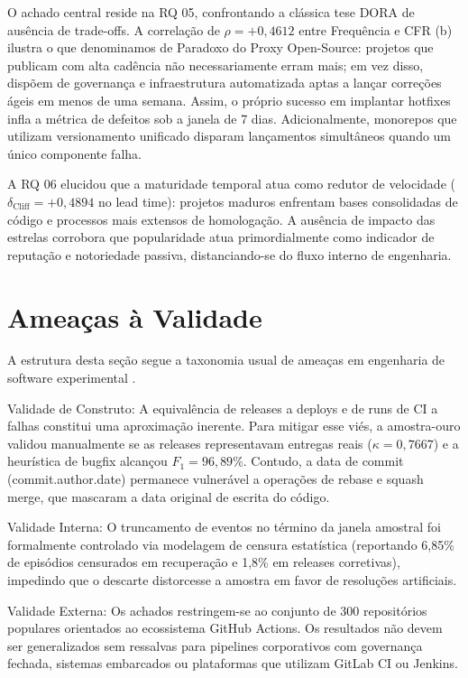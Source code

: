 \documentclass[12pt]{article}
\begin{document}
O achado central reside na RQ 05, confrontando a clássica tese DORA de ausência de trade-offs. A correlação de $\rho = +0{,}4612$ entre Frequência e CFR (b) ilustra o que denominamos de Paradoxo do Proxy Open-Source: projetos que publicam com alta cadência não necessariamente erram mais; em vez disso, dispõem de governança e infraestrutura automatizada aptas a lançar correções ágeis em menos de uma semana. Assim, o próprio sucesso em implantar hotfixes infla a métrica de defeitos sob a janela de 7 dias. Adicionalmente, monorepos que utilizam versionamento unificado disparam lançamentos simultâneos quando um único componente falha.

A RQ 06 elucidou que a maturidade temporal atua como redutor de velocidade ($\delta_{\text{Cliff}} = +0{,}4894$ no lead time): projetos maduros enfrentam bases consolidadas de código e processos mais extensos de homologação. A ausência de impacto das estrelas corrobora que popularidade atua primordialmente como indicador de reputação e notoriedade passiva, distanciando-se do fluxo interno de engenharia.

\section{Ameaças à Validade}
\label{sec:ameacas}

A estrutura desta seção segue a taxonomia usual de ameaças em engenharia de software experimental \cite{wohlin2012experimentation}.

Validade de Construto: A equivalência de releases a deploys e de runs de CI a falhas constitui uma aproximação inerente. Para mitigar esse viés, a amostra-ouro validou manualmente se as releases representavam entregas reais ($\kappa = 0{,}7667$) e a heurística de bugfix alcançou $F_1 = 96{,}89\%$. Contudo, a data de commit (commit.author.date) permanece vulnerável a operações de rebase e squash merge, que mascaram a data original de escrita do código.

Validade Interna: O truncamento de eventos no término da janela amostral foi formalmente controlado via modelagem de censura estatística (reportando 6,85\% de episódios censurados em recuperação e 1,8\% em releases corretivas), impedindo que o descarte distorcesse a amostra em favor de resoluções artificiais.

Validade Externa: Os achados restringem-se ao conjunto de 300 repositórios populares orientados ao ecossistema GitHub Actions. Os resultados não devem ser generalizados sem ressalvas para pipelines corporativos com governança fechada, sistemas embarcados ou plataformas que utilizam GitLab CI ou Jenkins.
\end{document}
